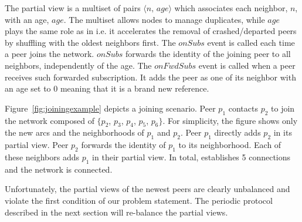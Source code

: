 \begin{algorithm}[h]

\caption{\label{algo:joining}The joining protocol of \SPRAY running at Peer $p$.}
\end{algorithm}

The partial view is a multiset of pairs $\langle n,\, age\rangle$
which associates each neighbor, $n$, with an age, $age$. The multiset
allows nodes to manage duplicates, while $age$ plays the same role as
in \CYCLON i.e.  it accelerates the removal of crashed/departed peers
by shuffling with the oldest neighbors first. The $onSubs$ event is
called each time a peer joins the network. $onSubs$ forwards the
identity of the joining peer to all neighbors, independently of the
age. The $onFwdSubs$ event is called when a peer receives such
forwarded subscription. It adds the peer as one of its neighbor with
an age set to $0$ meaning that it is a brand new reference.

\begin{figure*}
  \centering
  \hspace{8pt}
  \hspace{8pt}
  \caption{\label{fig:joiningexample}Example of the joining
    protocol of \SPRAY.}
\end{figure*}

Figure~\ref{fig:joiningexample} depicts a joining scenario.  Peer
$p_1$ contacts $p_2$ to join the network composed of $\{p_2$, $p_3$,
$p_4$, $p_5$, $p_6\}$. For simplicity, the figure shows only the new
arcs and the neighborhoods of $p_1$ and $p_2$. Peer $p_1$ directly adds
$p_2$ in its partial view. Peer $p_2$ forwards the identity of $p_1$
to its neighborhood. Each of these neighbors adds $p_1$ in their
partial view. In total, \SPRAY establishes 5 connections and the
network is connected.

Unfortunately, the partial views of the newest peers are clearly unbalanced and
violate the first condition of our problem statement. The periodic protocol
described in the next section will re-balance the partial views.

